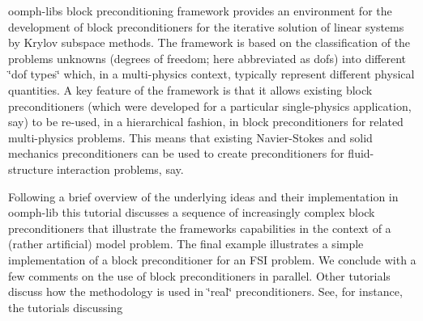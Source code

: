 {\ttfamily oomph-\/lib\textquotesingle{}s} block preconditioning framework provides an environment for the development of block preconditioners for the iterative solution of linear systems by Krylov subspace methods. The framework is based on the classification of the problem\textquotesingle{}s unknowns (degrees of freedom; here abbreviated as dofs) into different \char`\"{}dof types\char`\"{} which, in a multi-\/physics context, typically represent different physical quantities. A key feature of the framework is that it allows existing block preconditioners (which were developed for a particular single-\/physics application, say) to be re-\/used, in a hierarchical fashion, in block preconditioners for related multi-\/physics problems. This means that existing Navier-\/\+Stokes and solid mechanics preconditioners can be used to create preconditioners for fluid-\/structure interaction problems, say.

Following a brief overview of the underlying ideas and their implementation in {\ttfamily oomph-\/lib} this tutorial discusses a sequence of increasingly complex block preconditioners that illustrate the framework\textquotesingle{}s capabilities in the context of a (rather artificial) model problem. The final example illustrates a simple implementation of a block preconditioner for an F\+SI problem. We conclude with a few comments on the use of block preconditioners in parallel. Other tutorials discuss how the methodology is used in \char`\"{}real\char`\"{} preconditioners. See, for instance, the tutorials discussing


